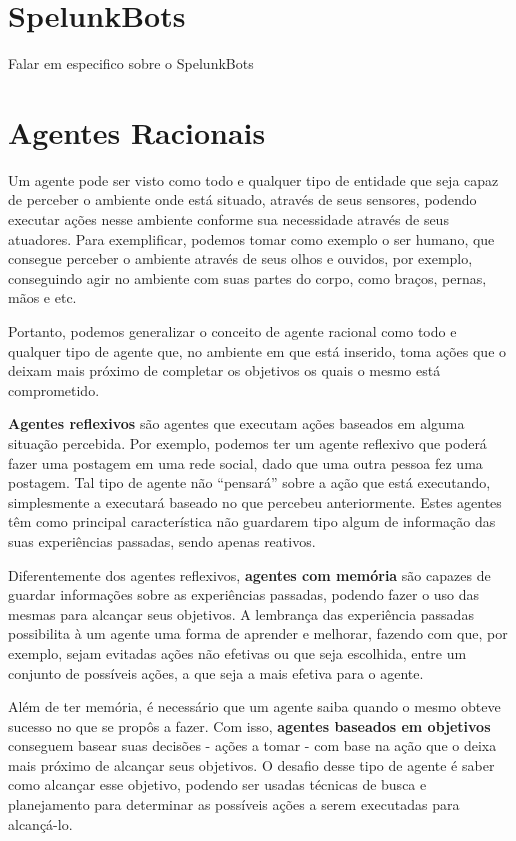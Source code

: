 \section{SpelunkBots}
Falar em especifico sobre o SpelunkBots



\section{Agentes Racionais}
Um agente pode ser visto como todo e qualquer tipo de entidade que seja capaz
de perceber o ambiente onde está situado, através de seus sensores, podendo
executar ações nesse ambiente conforme sua necessidade através de seus
atuadores.\cite{Russell:1995:AIM:193191} Para exemplificar, podemos tomar como
exemplo o ser humano, que consegue perceber o ambiente através de seus olhos e
ouvidos, por exemplo, conseguindo agir no ambiente com suas partes do corpo,
como braços, pernas, mãos e etc.  \cite{Russell:1995:AIM:193191}

Portanto, podemos generalizar o conceito de agente racional como todo e
qualquer tipo de agente que, no ambiente em que está inserido, toma ações que o
deixam mais próximo de completar os objetivos os quais o mesmo está
comprometido.

\textbf{Agentes reflexivos} são agentes que executam ações baseados em alguma
situação percebida. Por exemplo, podemos ter um agente reflexivo que poderá
fazer uma postagem em uma rede social, dado que uma outra pessoa fez uma
postagem. Tal tipo de agente não ``pensará'' sobre a ação que está executando,
simplesmente a executará baseado no que percebeu anteriormente. Estes agentes
têm como principal característica não guardarem tipo algum de informação das
suas experiências passadas, sendo apenas reativos.

Diferentemente dos agentes reflexivos, \textbf{agentes com memória} são capazes
de guardar informações sobre as experiências passadas, podendo fazer o uso das
mesmas para alcançar seus objetivos. A lembrança das experiência passadas
possibilita à um agente uma forma de aprender e melhorar, fazendo com que, por
exemplo, sejam evitadas ações não efetivas ou que seja escolhida, entre um
conjunto de possíveis ações, a que seja a mais efetiva para o agente.

Além de ter memória, é necessário que um agente saiba quando o mesmo obteve
sucesso no que se propôs a fazer. Com isso, \textbf{agentes baseados em
objetivos} conseguem basear suas decisões - ações a tomar - com base na ação
que o deixa mais próximo de alcançar seus objetivos. O desafio desse tipo de
agente é saber como alcançar esse objetivo, podendo ser usadas técnicas de
busca e planejamento para determinar as possíveis ações a serem executadas para
alcançá-lo.

